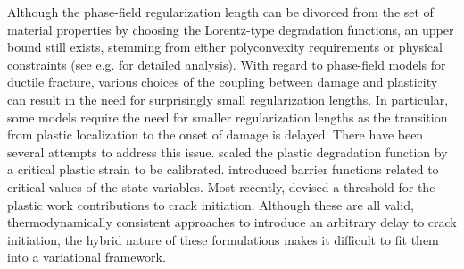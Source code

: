 Although the phase-field regularization length can be divorced from the set of material properties by choosing the Lorentz-type degradation functions, an upper bound still exists, stemming from either polyconvexity requirements or physical constraints (see e.g. \cite{wu2017unified, geelen2019phase} for detailed analysis). With regard to phase-field models for ductile fracture, various choices of the coupling between damage and plasticity can result in the need for surprisingly small regularization lengths.  In particular, some models require the need for smaller regularization lengths as the transition from plastic localization to the onset of damage is delayed.
There have been several attempts to address this issue. \citet{ambati_phase-field_2015,ambati2016phase} scaled the plastic degradation function by a critical plastic strain to be calibrated. \citet{miehe2015phase} introduced barrier functions related to critical values of the state variables. Most recently, \citet{borden2016phase} devised a threshold for the plastic work contributions to crack initiation. Although these are all valid, thermodynamically consistent approaches to introduce an arbitrary delay to crack initiation, the hybrid nature of these formulations makes it difficult to fit them into a variational framework.

